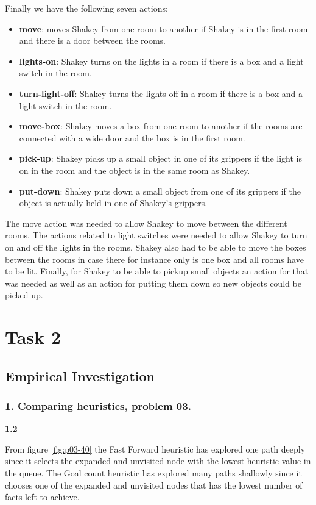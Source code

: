 \documentclass[a4paper,10pt]{article}
\begin{document}
Finally we have the following seven actions:
\begin{itemize}
    \item \textbf{move}: moves Shakey from one room to another if Shakey is in the first room and there is a door between the rooms.
    \item \textbf{lights-on}: Shakey turns on the lights in a room if there is a box and a light switch in the room.
    \item \textbf{turn-light-off}: Shakey turns the lights off in a room if there is a box and a light switch in the room.
    \item \textbf{move-box}: Shakey moves a box from one room to another if the rooms are connected with a wide door and the box is in the first room.
    \item \textbf{pick-up}: Shakey picks up a small object in one of its grippers if the light is on in the room and the object is in the same room as Shakey.
    \item \textbf{put-down}: Shakey puts down a small object from one of its grippers if the object is actually held in one of Shakey's grippers.
\end{itemize}
The move action was needed to allow Shakey to move between the different rooms. 
The actions related to light switches were needed to allow Shakey to turn on and off the lights in the rooms. 
Shakey also had to be able to move the boxes between the rooms in case there for instance only is one box and all rooms have to be lit. 
Finally, for Shakey to be able to pickup small objects an action for that was needed as well as an action for putting them down so new objects could be picked up.


\section*{Task 2}

\subsection*{Empirical Investigation}

\subsubsection*{1. Comparing heuristics, problem 03.}

\textbf{1.2}

From figure \ref{fig:p03-40} the Fast Forward heuristic has explored one path deeply since it selects the expanded and unvisited node with the lowest heuristic value in the queue. 
The Goal count heuristic has explored many paths shallowly since it chooses one of the expanded and unvisited nodes that has the lowest number of facts left to achieve.
\end{document}
